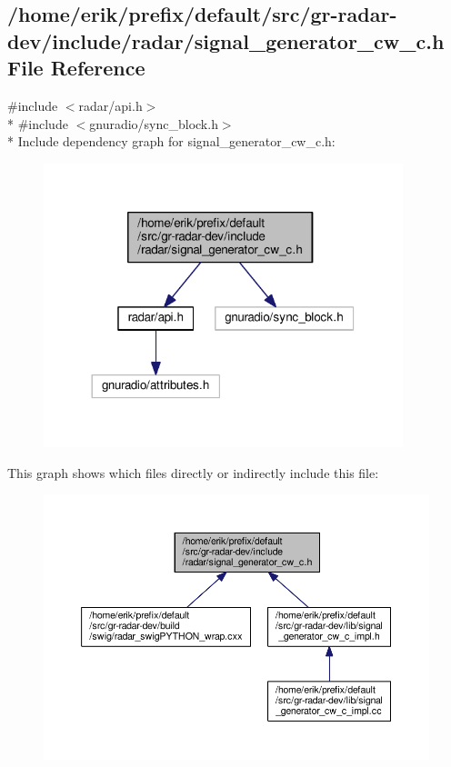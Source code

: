 \subsection{/home/erik/prefix/default/src/gr-\/radar-\/dev/include/radar/signal\+\_\+generator\+\_\+cw\+\_\+c.h File Reference}
\label{signal__generator__cw__c_8h}
{\ttfamily \#include $<$radar/api.\+h$>$}\\*
{\ttfamily \#include $<$gnuradio/sync\+\_\+block.\+h$>$}\\*
Include dependency graph for signal\+\_\+generator\+\_\+cw\+\_\+c.\+h\+:
\nopagebreak
\begin{figure}[H]
\begin{center}
\leavevmode
\includegraphics[width=296pt]{d2/d87/signal__generator__cw__c_8h__incl}
\end{center}
\end{figure}
This graph shows which files directly or indirectly include this file\+:
\nopagebreak
\begin{figure}[H]
\begin{center}
\leavevmode
\includegraphics[width=350pt]{d9/dba/signal__generator__cw__c_8h__dep__incl}
\end{center}
\end{figure}
